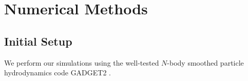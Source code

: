 \section{Numerical Methods}
\label{methods}

\subsection{Initial Setup}
\label{setup}

We perform our simulations using the well-tested $N$-body smoothed particle hydrodynamics code GADGET2 \citep{Springel2005}.